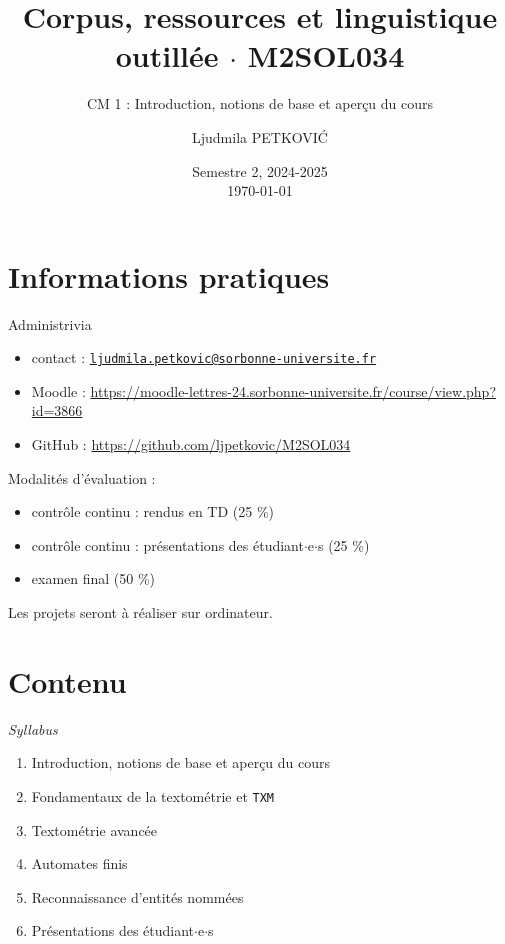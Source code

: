 \documentclass[xetex,xcolor={table,usenames,dvipsnames}]{beamer}
\begin{document}
\title{{\large Corpus, ressources et linguistique outillée $\cdot$ \textsc{M2SOL034}}}
\subtitle{CM 1 : Introduction, notions de base et aperçu du cours}
\author{\footnotesize{Ljudmila PETKOVI\'C}}
\date{\scriptsize{Semestre 2, 2024-2025\\\today}}



	\frame{\titlepage}

\section{Informations pratiques}

\begin{frame}{Administrivia}
	\begin{itemize}
		\item contact : \href{mailto:ljudmila.petkovic@sorbonne-universite.fr}{\texttt{ljudmila.petkovic@sorbonne-universite.fr}}
		\item Moodle : \url{https://moodle-lettres-24.sorbonne-universite.fr/course/view.php?id=3866}
		\item GitHub : \url{https://github.com/ljpetkovic/M2SOL034}
	\end{itemize}
	Modalités d'évaluation :
	\begin{itemize}
		\item contrôle continu : rendus en TD (25 \%)
		\item contrôle continu : présentations des étudiant$\cdot$e$\cdot$s  (25 \%)
		\item examen final (50 \%)
	\end{itemize}
	{\small Les projets seront à réaliser sur ordinateur.}
\end{frame}

\section{Contenu} 

\begin{frame}{\textit{Syllabus}}
	\begin{enumerate}
		\item Introduction, notions de base et aperçu du cours
		\item Fondamentaux de la textométrie et \texttt{TXM}
		\item Textométrie avancée
		\item Automates finis
		\item Reconnaissance d'entités nommées
		\item Présentations des étudiant$\cdot$e$\cdot$s
	\end{enumerate}
\end{frame}
\end{document}
